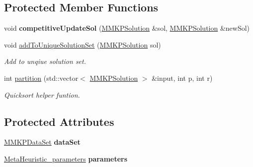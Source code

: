 \subsection*{Protected Member Functions}
\begin{DoxyCompactItemize}
\item 
\hypertarget{class_m_m_k_p___meta_heuristic_a712e028ff1bb1812ea16309994fd254e}{void {\bfseries competitive\+Update\+Sol} (\hyperlink{class_m_m_k_p_solution}{M\+M\+K\+P\+Solution} \&sol, \hyperlink{class_m_m_k_p_solution}{M\+M\+K\+P\+Solution} \&new\+Sol)}\label{class_m_m_k_p___meta_heuristic_a712e028ff1bb1812ea16309994fd254e}

\item 
void \hyperlink{class_m_m_k_p___meta_heuristic_a5f9cad13b11c32134cb4d56275dbdff1}{add\+To\+Unique\+Solution\+Set} (\hyperlink{class_m_m_k_p_solution}{M\+M\+K\+P\+Solution} sol)
\begin{DoxyCompactList}\small\item\em Add to unqiue solution set. \end{DoxyCompactList}\item 
\hypertarget{class_m_m_k_p___meta_heuristic_a39666b38d835cd40e39bd40e6210a3de}{int \hyperlink{class_m_m_k_p___meta_heuristic_a39666b38d835cd40e39bd40e6210a3de}{partition} (std\+::vector$<$ \hyperlink{class_m_m_k_p_solution}{M\+M\+K\+P\+Solution} $>$ \&input, int p, int r)}\label{class_m_m_k_p___meta_heuristic_a39666b38d835cd40e39bd40e6210a3de}

\begin{DoxyCompactList}\small\item\em Quicksort helper funtion. \end{DoxyCompactList}\end{DoxyCompactItemize}
\subsection*{Protected Attributes}
\begin{DoxyCompactItemize}
\item 
\hypertarget{class_m_m_k_p___meta_heuristic_aae7839d83a097e83579ad478f4580088}{\hyperlink{class_m_m_k_p_data_set}{M\+M\+K\+P\+Data\+Set} {\bfseries data\+Set}}\label{class_m_m_k_p___meta_heuristic_aae7839d83a097e83579ad478f4580088}

\item 
\hypertarget{class_m_m_k_p___meta_heuristic_a2af79355b04e7cea245642419bf5f8fa}{\hyperlink{class_meta_heuristic__parameters}{Meta\+Heuristic\+\_\+parameters} {\bfseries parameters}}\label{class_m_m_k_p___meta_heuristic_a2af79355b04e7cea245642419bf5f8fa}

\end{DoxyCompactItemize}


